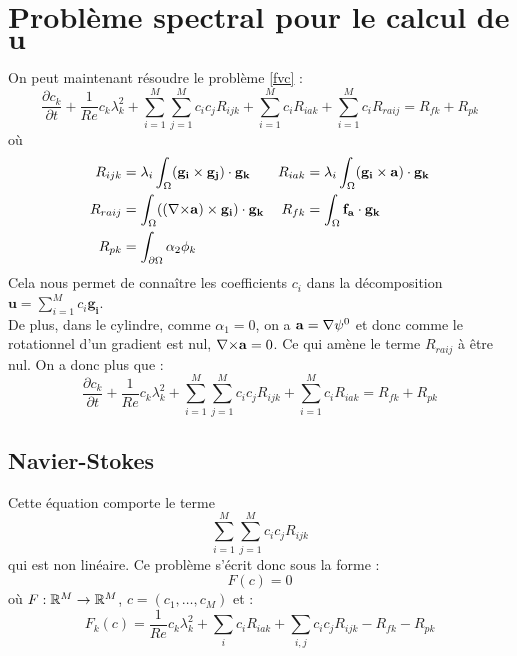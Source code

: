 \chapter{Problème spectral pour le calcul de $\mathbf{u}$}
On peut maintenant résoudre le problème \ref{fvc} :
\[ \frac{\partial c_k}{\partial t} + \frac{1}{Re}c_k\lambda_k^2 + \sum_{i=1}^M\sum_{j=1}^Mc_ic_jR_{ijk} + \sum_{i=1}^Mc_iR_{iak} + \sum_{i=1}^Mc_iR_{raij} = R_{fk}+R_{pk} \]
où
\begin{align*}
R_{ijk} &= \lambda_i\int_\Omega(\mathbf{g_i}\times \mathbf{g_j})\cdot\mathbf{g_k} & R_{iak} &= \lambda_i\int_\Omega(\mathbf{g_i}\times \mathbf{a})\cdot\mathbf{g_k}\\
R_{raij} &= \int_\Omega(({\nabla\times}\mathbf{a})\times \mathbf{g_i})\cdot\mathbf{g_k} & R_{fk} &= \int_\Omega\mathbf{f_a}\cdot\mathbf{g_k}\\
R_{pk} &= \int_{\partial\Omega} \alpha_2\phi_k
\end{align*}
Cela nous permet de connaître les coefficients $c_i$ dans la décomposition $\mathbf{u}=\sum_{i=1}^M c_i\mathbf{g_i}$.\\


De plus, dans le cylindre, comme $\alpha_1=0$, on a $\mathbf{a}={\nabla}\psi^0$ et donc comme le rotationnel d'un gradient est nul, ${\nabla\times} \mathbf{a} = 0$. Ce qui amène le terme $R_{raij}$ à être nul. On a donc plus que :
\[ \frac{\partial c_k}{\partial t} + \frac{1}{Re}c_k\lambda_k^2 + \sum_{i=1}^M\sum_{j=1}^Mc_ic_jR_{ijk} + \sum_{i=1}^Mc_iR_{iak} = R_{fk}+R_{pk} \]

\section{Navier-Stokes}
\label{PSNewton}
Cette équation comporte le terme
\[ \sum_{i=1}^M\sum_{j=1}^M c_i c_jR_{ijk} \]
qui est non linéaire. Ce problème s'écrit donc sous la forme :
\[ F(c) = 0 \]
où $F:{\mathbb{R}}^M\rightarrow{\mathbb{R}}^M$, $c=(c_1,\ldots, c_M)$ et :
\begin{equation}\label{psf}
 F_k(c) = \frac{1}{Re} c_k\lambda_k^2 + \sum_i c_i R_{iak} + \sum_{i,j} c_i c_j R_{ijk} - R_{fk} - R_{pk}
\end{equation}

